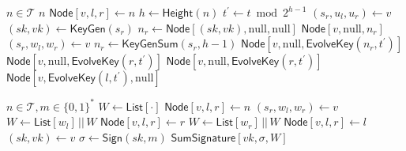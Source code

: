 \documentclass{article}
\begin{document}
\begin{algorithm}
\caption{$\mathsf{EvolveKey}: n,t \to \mathsf{\hyperref[def:Node]{Node}}  $}\label{alg:EvolveKey}
\begin{algorithmic}[1]
\Require $n\in \mathcal{T}$
    \State \Return $n$
\Else
    \State $\mathsf{\hyperref[def:Node]{Node}}[v,l,r] \gets n$
    \State $h\gets \mathsf{\hyperref[alg:Height]{Height}}(n)$
    \State $t^\prime \gets t \bmod 2^{h-1}$
                \State $(s_r,u_l,u_r) \gets v$
                \State $(sk,vk) \gets \mathsf{\hyperref[def:KeyGen]{KeyGen}}(s_r)$
                \State $n_r \gets \mathsf{\hyperref[def:Node]{Node}}[(sk,vk),\mathrm{null},\mathrm{null}]$
                \State \Return  $\mathsf{\hyperref[def:Node]{Node}}[v,\mathrm{null},n_r]$
            \Else
                \State $(s_r,w_l,w_r) \gets v$
                \State $n_r \gets \mathsf{\hyperref[alg:KeyGenSum]{KeyGenSum}}(s_r,h-1)$
                \State \Return $\mathsf{\hyperref[def:Node]{Node}}[v,\mathrm{null},\mathsf{\hyperref[alg:EvolveKey]{EvolveKey}}(n_r,t^\prime)]$
            \EndIf
        \Else
            \State \Return $\mathsf{\hyperref[def:Node]{Node}}[v,\mathrm{null},\mathsf{\hyperref[alg:EvolveKey]{EvolveKey}}(r,t^\prime)]$
        \EndIf
    \Else
            \State \Return $\mathsf{\hyperref[def:Node]{Node}}[v,\mathrm{null},\mathsf{\hyperref[alg:EvolveKey]{EvolveKey}}(r,t^\prime)]$
        \Else
            \State \Return $\mathsf{\hyperref[def:Node]{Node}}[v,\mathsf{\hyperref[alg:EvolveKey]{EvolveKey}}(l,t^\prime),\mathrm{null}]$
        \EndIf
    \EndIf
\EndIf
\end{algorithmic}
\end{algorithm}

\begin{algorithm}
\caption{$\mathsf{SignSum}: n, m \to \mathsf{\hyperref[def:SumSignature]{SumSignature}}$}\label{alg:SignSum}
\begin{algorithmic}[1]
\Require $n\in \mathcal{T}, m\in \{0,1\}^*$
\State $W\gets \mathsf{\hyperref[def:List]{List}}[\cdot]$
\State $\mathsf{\hyperref[def:Node]{Node}}[v,l,r] \gets n$
    \State $(s_r,w_l,w_r)\gets v$
        \State $W \gets \mathsf{\hyperref[def:List]{List}}[w_l] \,||\, W$
        \State $\mathsf{\hyperref[def:Node]{Node}}[v,l,r] \gets r$
    \Else
        \State $W \gets \mathsf{\hyperref[def:List]{List}}[w_r] \,||\, W$
        \State $\mathsf{\hyperref[def:Node]{Node}}[v,l,r] \gets l$
    \EndIf
\EndWhile
\State $(sk,vk) \gets v$
\State $\sigma \gets \mathsf{\hyperref[def:Sign]{Sign}}(sk,m)$
\State \Return $\mathsf{\hyperref[def:SumSignature]{SumSignature}}[vk,\sigma,W]$
\end{algorithmic}
\end{algorithm}
\end{document}
